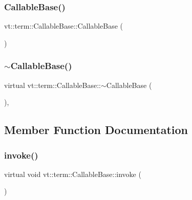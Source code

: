 \subsubsection{\texorpdfstring{Callable\+Base()}{CallableBase()}\hspace{0.1cm}{\footnotesize\ttfamily [3/3]}}
{\footnotesize\ttfamily vt\+::term\+::\+Callable\+Base\+::\+Callable\+Base (\begin{DoxyParamCaption}\item[{\hyperlink{structvt_1_1term_1_1_callable_base}{Callable\+Base} \&\&}]{ }\end{DoxyParamCaption})\hspace{0.3cm}{\ttfamily [default]}}

\mbox{\label{structvt_1_1term_1_1_callable_base_a436cddd808a4935f2f1c78f85ff1f88b}} 
\subsubsection{\texorpdfstring{$\sim$\+Callable\+Base()}{~CallableBase()}}
{\footnotesize\ttfamily virtual vt\+::term\+::\+Callable\+Base\+::$\sim$\+Callable\+Base (\begin{DoxyParamCaption}{ }\end{DoxyParamCaption})\hspace{0.3cm}{\ttfamily [virtual]}, {\ttfamily [default]}}



\subsection{Member Function Documentation}
\mbox{\label{structvt_1_1term_1_1_callable_base_a534f470aaf4dd168faa9adf3c91e6ca2}} 
\subsubsection{\texorpdfstring{invoke()}{invoke()}}
{\footnotesize\ttfamily virtual void vt\+::term\+::\+Callable\+Base\+::invoke (\begin{DoxyParamCaption}{ }\end{DoxyParamCaption})\hspace{0.3cm}{\ttfamily [pure virtual]}}



